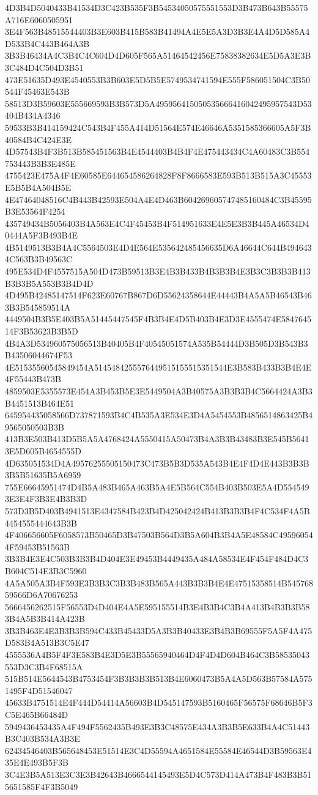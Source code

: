{{{{{{{{{{{{{{{{{{{{{4D3B4D5040433B41534D3C423B535F3B54534050575551553D3B473B643B55575A716E6060505951
3E4F563B48515544403B3E603B415B583B41494A4E5E5A3D3B3E4A4D5D585A4D533B4C443B464A3B
3B3B46434A4C3B4C4C604D4D605F565A51464542456E75838382634E5D5A3E3B3C484D4C504D3B51
473E51635D493E4540553B3B603E5D5B5E5749534741594E555F586051504C3B50544F45463E543B
58513D3B59603E555669593B3B573D5A495956415050535666416042495957543D53404B434A4346
59533B3B414159424C543B4F455A414D51564E574E46646A5351585366605A5F3B40584B4C424E3E
4D57543B4F3B513B585451563B4E4544403B4B4F4E475443434C4A60483C3B554753443B3B3E485E
4755423E475A4F4E60585E644654586264828F8F8666583E593B513B515A3C45553E5B5B4A504B5E
4E47464048516C4B443B42593E504A4E4D463B604269605747485160484C3B45595B3E53564F4254
435749434B5056403B4A563E4C4F45453B4F514951633E4E5E3B3B445A46534D40444A5F3B493B4E
4B5149513B3B4A4C5564503E4D4E564E535642485456635D6A46644C644B4946434C563B3B49563C
495E534D4F4557515A504D473B59513B3E4B3B433B4B3B3B4E3B3C3B3B3B413B3B3B5A553B3B4D4D
4D495B42485147514F623E60767B867D6D55624358644E44443B4A5A5B46543B463B3B545859514A
4449504B3B5E403B5A51445447545F4B3B4E4D5B403B4E3D3E4555474E584764514F3B53623B3B5D
4B4A3D534960575056513B40405B4F40545051574A535B54444D3B505D3B543B3B43506044674F53
4E51535560545849454A5145484255576449515155515351544E3B583B433B3B4E4E4F55443B473B
4859503E5355573E454A3B453B5E3E5449504A3B40575A3B3B3B4C5664424A3B3B4451513B464E51
645954435058566D737871593B4C4B535A3E534E3D4A5454553B4856514863425B49565050503B3B
413B3E503B413D5B5A5A4768424A5550415A50473B4A3B3B43483B3E545B56413E5D605B4654555D
4D635051534D4A49576255505150473C473B5B3D535A543B4E4F4D4E443B3B3B3B5B51635B5A6959
755E66645951474D4B5A483B465A463B5A4E5B564C554B403B503E5A4D5545493E3E4F3B3E4B3B3D
573D3B5D403B4941513E4347584B423B4D425042424B413B3B3B4F4C534F4A5B4454555444643B3B
4F406656605F6058573B50465D3B47503B564D3B5A604B3B4A5E48584C495960544F59453B51563B
3B3B4E3E4C503B3B3B4D404E3E49453B4449435A484A58534E4F454F484D4C3B604C514E3B3C5960
4A5A505A3B4F593E3B3B3C3B3B483B565A443B3B3B4E4E47515358514B54576859566D6A70676253
5666456262515F56553D4D404E4A5E595155514B3E4B3B4C3B4A413B4B3B3B583B4A5B3B414A423B
3B3B463E4E3B3B3B594C433B45433D5A3B3B40433E3B4B3B69555F5A5F4A475D583B4A513B3C5E47
4555536A4B5F4F3E583B4E3D5E3B55565940464D4F4D4D604B464C3B58535043553D3C3B4F68515A
515B514E5644543B4753454F3B3B3B3B513B4E6060473B5A4A5D563B57584A5751495F4D51546047
45633B4751514E4F444D54414A56603B4D545147593B5160465F56575F68646B5F3C5E465B66484D
5949436453435A4F494F5562435B493E3B3C48575E434A3B3B5E633B4A4C51443B3C403B534A3B3E
62434546403B565648453E51514E3C4D55594A4651584E55584E46544D3B59563E435E4E493B5F3B
3C4E3B5A513E3C3E3B42643B4666544145493E5D4C573D414A473B4F483B3B515651585F4F3B5049
}}}}}}}}}}}}}}}}}}}}}
